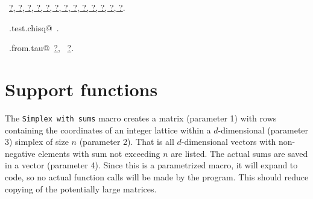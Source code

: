 \documentclass[reqno]{amsart}
\renewcommand{\NWlink}[2]{\hyperlink{#1}{#2}}
\begin{document}
\begin{flushleft}
\begin{list}{}{\setlength{\itemsep}{-\parsep}\setlength{\itemindent}{-\leftmargin}}
\item \NWtxtFileDefBy\ \NWlink{nuweb?}{?}\NWlink{nuweb?}{, ?}\NWlink{nuweb?}{, ?}\NWlink{nuweb?}{, ?}\NWlink{nuweb?}{, ?}\NWlink{nuweb?}{, ?}\NWlink{nuweb?}{, ?}\NWlink{nuweb?}{, ?}\NWlink{nuweb?}{, ?}\NWlink{nuweb?}{, ?}\NWlink{nuweb?}{, ?}\NWlink{nuweb?}{, ?}\NWlink{nuweb?}{, ?}.
\item \NWtxtIdentsDefed\nobreak\  \verb@mc.test.chisq@\nobreak\ \NWtxtIdentsNotUsed.\item \NWtxtIdentsUsed\nobreak\  \verb@corr.from.tau@\nobreak\ \NWlink{nuweb?}{?}, \verb@tau@\nobreak\ \NWlink{nuweb?}{?}.
\item{}
\end{list}
\vspace{4ex}
\end{flushleft}
\section{Support functions}

The \texttt{Simplex with sums} macro creates a matrix (parameter 1) with rows containing the coordinates of an
integer lattice within a $d$-dimensional (parameter 3) simplex of size $n$ (parameter 2). That is all $d$-dimensional
vectors with non-negative elements with sum not exceeding $n$ are listed. The actual sums are saved in a vector (parameter 4).
Since this is a parametrized macro, it will expand to code, so no actual function calls will be made by the program.
This should reduce copying of the potentially large matrices.
\end{document}
